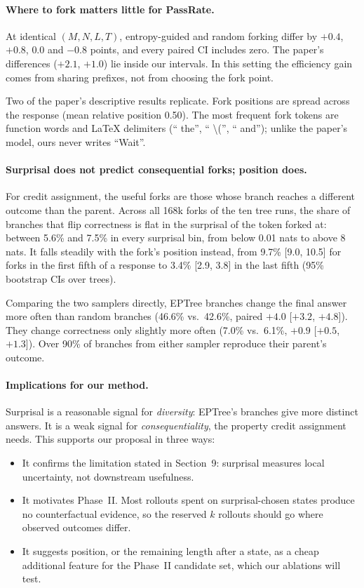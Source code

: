\paragraph{Where to fork matters little for PassRate.}
At identical $(M,N,L,T)$, entropy-guided and random forking differ by $+0.4$, $+0.8$, $0.0$ and $-0.8$ points, and every paired CI includes zero. The paper's differences ($+2.1$, $+1.0$) lie inside our intervals. In this setting the efficiency gain comes from sharing prefixes, not from choosing the fork point.

Two of the paper's descriptive results replicate. Fork positions are spread across the response (mean relative position 0.50). The most frequent fork tokens are function words and \LaTeX{} delimiters (`` the'', `` \textbackslash('', `` and''); unlike the paper's model, ours never writes ``Wait''.

\paragraph{Surprisal does not predict consequential forks; position does.}
For credit assignment, the useful forks are those whose branch reaches a different outcome than the parent. Across all 168k forks of the ten tree runs, the share of branches that flip correctness is flat in the surprisal of the token forked at: between 5.6\% and 7.5\% in every surprisal bin, from below 0.01 nats to above 8 nats. It falls steadily with the fork's position instead, from 9.7\% [9.0, 10.5] for forks in the first fifth of a response to 3.4\% [2.9, 3.8] in the last fifth (95\% bootstrap CIs over trees).

Comparing the two samplers directly, EPTree branches change the final answer more often than random branches (46.6\% vs.\ 42.6\%, paired $+4.0$ [$+3.2$, $+4.8$]). They change correctness only slightly more often (7.0\% vs.\ 6.1\%, $+0.9$ [$+0.5$, $+1.3$]). Over 90\% of branches from either sampler reproduce their parent's outcome.

\paragraph{Implications for our method.}
Surprisal is a reasonable signal for \emph{diversity}: EPTree's branches give more distinct answers. It is a weak signal for \emph{consequentiality}, the property credit assignment needs. This supports our proposal in three ways:
\begin{itemize}
\item It confirms the limitation stated in Section~9: surprisal measures local uncertainty, not downstream usefulness.
\item It motivates Phase~II. Most rollouts spent on surprisal-chosen states produce no counterfactual evidence, so the reserved $k$ rollouts should go where observed outcomes differ.
\item It suggests position, or the remaining length after a state, as a cheap additional feature for the Phase~II candidate set, which our ablations will test.
\end{itemize}

